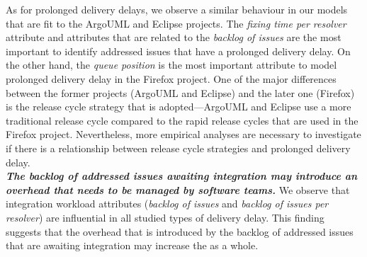 As for prolonged delivery delays, we observe a similar behaviour in our models that
are fit to the ArgoUML and Eclipse projects. The \textit{fixing time per
resolver} attribute and attributes that are related to the \textit{backlog of
issues} are the most important to identify addressed issues that have a
prolonged delivery delay. On the other hand, the \textit{queue position} is the most
important attribute to model prolonged delivery delay in the Firefox project. One of
the major differences between the former projects (ArgoUML and Eclipse) and the
later one (Firefox) is the release cycle strategy that is adopted---ArgoUML and
Eclipse use a more traditional release cycle compared to the rapid release
cycles that are used in the Firefox project. Nevertheless, more empirical
analyses are necessary to investigate if there is a relationship between release
cycle strategies and prolonged delivery delay.\\

\noindent\textbf{\textit{The backlog of addressed issues awaiting integration
may introduce an overhead that needs to be managed by software teams.}} We
observe that integration workload attributes (\eg \textit{backlog of issues} and
\textit{backlog of issues per resolver}) are influential in all studied types of
delivery delay. This finding suggests that the overhead that is introduced by
the backlog of addressed issues that are awaiting integration may increase the
\DIFdelbegin {}\DIFdelend \DIFaddbegin {}\DIFaddend as a whole. 

